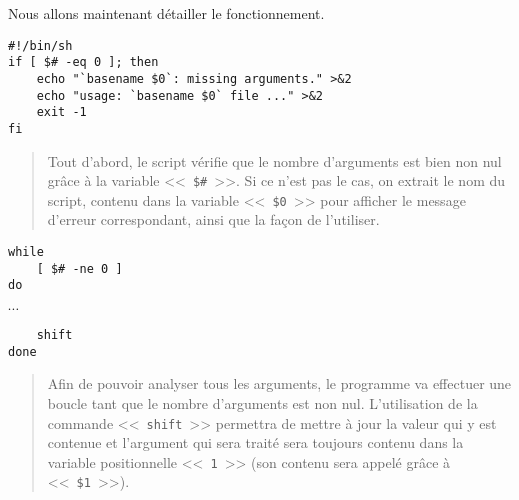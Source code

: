 Nous allons maintenant d{\'e}tailler le fonctionnement.

\begin{verbatim}
#!/bin/sh
if [ $# -eq 0 ]; then
    echo "`basename $0`: missing arguments." >&2
    echo "usage: `basename $0` file ..." >&2
    exit -1
fi
\end{verbatim}
\begin{quote}

Tout d'abord, le script v{\'e}rifie que le nombre d'arguments est bien non nul gr{\^a}ce {\`a} la variable <<~\verb,$#,~>>. Si ce n'est pas le cas, on extrait le nom du script, contenu dans la variable <<~\verb,$0,~>> pour afficher le message d'erreur correspondant, ainsi que la fa\c{c}on de l'utiliser.
\end{quote}

\begin{verbatim}
while
    [ $# -ne 0 ]
do
\end{verbatim}
\vspace{2ex}
$\cdots$
\\[2ex]
\begin{verbatim}
    shift
done
\end{verbatim}
\begin{quote}
Afin de pouvoir analyser tous les arguments, le programme va effectuer une boucle tant que le nombre d'arguments est non nul. L'utilisation de la commande <<~{\tt shift}~>> permettra de mettre {\`a} jour la valeur qui y est contenue et l'argument qui sera trait{\'e} sera toujours contenu dans la variable positionnelle <<~{\tt 1}~>> (son contenu sera appel{\'e} gr{\^a}ce {\`a} <<~\verb=$1=~>>).
\end{quote}

